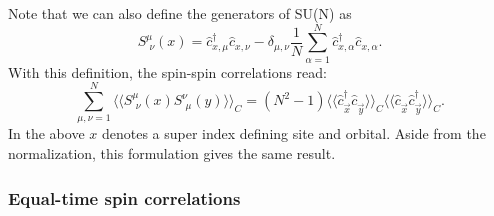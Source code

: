 Note that we  can also  define the generators of SU(N) as 
\begin{equation}
	S^{\mu}_{\, \,  \nu} (x)  =  \hat{c}^{\dagger}_{x,\mu} \hat{c}^{}_{x,\nu}    - \delta_{\mu,\nu} \frac{1}{N}  \sum_{\alpha = 1}^{N} \hat{c}^{\dagger}_{x,\alpha} \hat{c}^{}_{x,\alpha}.   
\end{equation}
With this definition, the spin-spin correlations read: 
\begin{equation}
      \sum_{\mu,\nu=1}^{N}\langle \langle S^{\mu}_{\, \,  \nu} (x)   S^{\nu}_{\, \,  \mu} (y)  \rangle  \rangle_C =  
      (N^2-1)      \langle \langle \hat{c}^{\dagger}_{\vec{x} }   \hat{c}^{\phantom\dagger}_{\vec{y} } \rangle\rangle_C  \langle \langle   \hat{c}^{\phantom\dagger}_{\vec{x}}   \hat{c}^{\dagger}_{\vec{y} } \rangle\rangle_C . 
\end{equation}
In the above $x$ denotes a super index  defining site and orbital. Aside from the normalization, this formulation  gives the same result.  
\subsubsection{Equal-time spin correlations}

